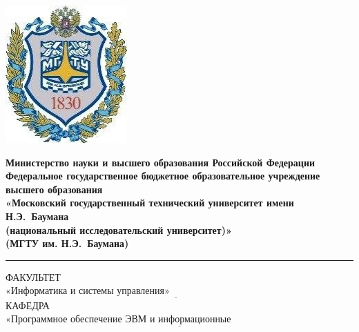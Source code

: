 
\begin{titlepage}
	\fontsize{12pt}{12pt}\selectfont
	\noindent \begin{minipage}{0.15\textwidth}
		\includegraphics[width=\linewidth]{assets/b_logo.jpg}
	\end{minipage}
	\noindent\begin{minipage}{0.9\textwidth}\centering
		\textbf{Министерство науки и высшего образования Российской Федерации}\\
		\textbf{Федеральное государственное бюджетное образовательное учреждение высшего образования}\\
		\textbf{«Московский государственный технический университет имени Н.Э.~Баумана}\\
		\textbf{(национальный исследовательский университет)»}\\
		\textbf{(МГТУ им. Н.Э.~Баумана)}
	\end{minipage}
	
	\noindent\rule{18cm}{3pt}
	\newline\newline
	\noindent ФАКУЛЬТЕТ $\underline{\text{«Информатика и системы управления»~~~~~~~~~~~~~~~~~~~~~~~~~~~~~~~~~~~~~~~~~~~~~~~~~~~~~~~}}$ \newline\newline
	\noindent КАФЕДРА $\underline{\text{«Программное обеспечение ЭВМ и информационные технологии»~~~~~~~~~~~~~~~~~~~~~~~}}$\newline\newline\newline\newline\newline\newline\newline
	

\end{titlepage}
